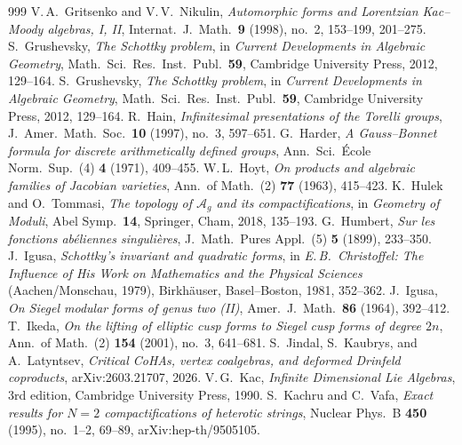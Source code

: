 \begin{thebibliography}{999}
 V.\,A.~Gritsenko and V.\,V.~Nikulin, \emph{Automorphic forms and Lorentzian Kac--Moody algebras, I, II}, Internat.\ J.\ Math.\ \textbf{9} (1998), no.~2, 153--199, 201--275. %
 S.~Grushevsky, \emph{The Schottky problem}, in \emph{Current Developments in Algebraic Geometry}, Math.\ Sci.\ Res.\ Inst.\ Publ.\ \textbf{59}, Cambridge University Press, 2012, 129--164. %
 S.~Grushevsky, \emph{The Schottky problem}, in \emph{Current Developments in Algebraic Geometry}, Math.\ Sci.\ Res.\ Inst.\ Publ.\ \textbf{59}, Cambridge University Press, 2012, 129--164.
 R.~Hain, \emph{Infinitesimal presentations of the Torelli groups}, J.~Amer.\ Math.\ Soc.\ \textbf{10} (1997), no.~3, 597--651.
 G.~Harder, \emph{A Gauss--Bonnet formula for discrete arithmetically defined groups}, Ann.\ Sci.\ \'Ecole Norm.\ Sup.\ (4) \textbf{4} (1971), 409--455.
 W.\,L.~Hoyt, \emph{On products and algebraic families of Jacobian varieties}, Ann.\ of Math.\ (2) \textbf{77} (1963), 415--423.
 K.~Hulek and O.~Tommasi, \emph{The topology of $\mathcal A_g$ and its compactifications}, in \emph{Geometry of Moduli}, Abel Symp.\ \textbf{14}, Springer, Cham, 2018, 135--193.
 G.~Humbert, \emph{Sur les fonctions ab\'eliennes singuli\`eres}, J.~Math.\ Pures Appl.\ (5) \textbf{5} (1899), 233--350.
 J.~Igusa, \emph{Schottky's invariant and quadratic forms}, in \emph{E.\,B.\ Christoffel: The Influence of His Work on Mathematics and the Physical Sciences} (Aachen/Monschau, 1979), Birkh\"auser, Basel--Boston, 1981, 352--362.
 J.~Igusa, \emph{On Siegel modular forms of genus two (II)}, Amer.\ J.\ Math.\ \textbf{86} (1964), 392--412.
 T.~Ikeda, \emph{On the lifting of elliptic cusp forms to Siegel cusp forms of degree $2n$}, Ann.\ of Math.\ (2) \textbf{154} (2001), no.~3, 641--681. %
 S.~Jindal, S.~Kaubrys, and A.~Latyntsev, \emph{Critical CoHAs, vertex coalgebras, and deformed Drinfeld coproducts}, arXiv:2603.21707, 2026. %
 V.\,G.~Kac, \emph{Infinite Dimensional Lie Algebras}, 3rd edition, Cambridge University Press, 1990. %
 S.~Kachru and C.~Vafa, \emph{Exact results for $N{=}2$ compactifications of heterotic strings}, Nuclear Phys.\ B \textbf{450} (1995), no.~1--2, 69--89, arXiv:hep-th/9505105.

\end{thebibliography}
